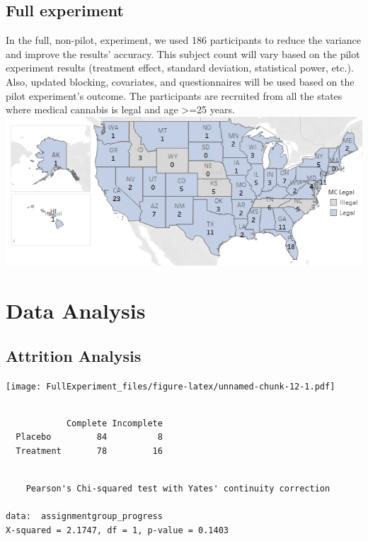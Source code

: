 \documentclass[
]{article}
\begin{document}
\hypertarget{full-experiment}{%
\subsection{Full experiment}\label{full-experiment}}

In the full, non-pilot, experiment, we used 186 participants to reduce
the variance and improve the results' accuracy. This subject count will
vary based on the pilot experiment results (treatment effect, standard
deviation, statistical power, etc.). Also, updated blocking, covariates,
and questionnaires will be used based on the pilot experiment's outcome.
The participants are recruited from all the states where medical
cannabis is legal and age \textgreater=25 years.\\
\includegraphics{participants_map.png}

\hypertarget{data-analysis}{%
\section{Data Analysis}\label{data-analysis}}

\hypertarget{attrition-analysis}{%
\subsection{Attrition Analysis}\label{attrition-analysis}}

\texttt{[image: FullExperiment\_files/figure-latex/unnamed-chunk-12-1.pdf]}

\begin{verbatim}
           
            Complete Incomplete
  Placebo         84          8
  Treatment       78         16
\end{verbatim}

\begin{verbatim}

    Pearson's Chi-squared test with Yates' continuity correction

data:  assignmentgroup_progress
X-squared = 2.1747, df = 1, p-value = 0.1403
\end{verbatim}
\end{document}
